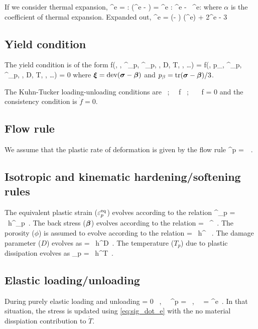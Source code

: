 If we consider thermal expansion,
\Beq
  \dot{\Bsig}^e =  : \left(\dot{\BVeps}^e - \alpha {}\BI\right)
                = \SfC^e : \dot{\BVeps}^e - \alpha {}\, \SfC^e:\BI
\Eeq
where $\alpha$ is the coefficient of thermal expansion.
Expanded out, 
\Beq \label{eq:sig_dot_e}
  \dot{\Bsig}^e = \left(\kappa - \mu\right) \Tr(\dot{\BVeps}^e) \BI + 2\mu\dot{\BVeps}^e 
                - 3\kappa\alpha{}\BI 
\Eeq

\subsection{Yield condition}
The yield condition is of the form
\Beq
  f(\Bsig, \Bbeta, \Veps^\Teq_p, \dot{\Veps}^\Teq_p, \phi, D, T, \Edot{\Teq}, \dots) =
  f(\Bxi, p_\beta, \Veps^\Teq_p, \dot{\Veps}^\Teq_p, \phi, D, T, \Edot{\Teq}, \dots) = 0
\Eeq
where $\boldsymbol{\xi} = \text{dev}(\boldsymbol{\sigma} - \boldsymbol{\beta})$ and $p_\beta = \text{tr}(\boldsymbol{\sigma} - \boldsymbol{\beta})/3$. 

The Kuhn-Tucker loading-unloading conditions are
\Beq
  \dot{\lambda}  ~;~~  f  ~;~~ \dot{\lambda}~f = 0
\Eeq
and the consistency condition is $\dot{f} = 0$.

\subsection{Flow rule}
We assume that the plastic rate of deformation is given by the flow rule
\Beq
  \dot{\BVeps}^p = \dot{\lambda}~\BM \,.
\Eeq

\subsection{Isotropic and kinematic hardening/softening rules}
The equivalent plastic strain ($\varepsilon_p^{\text{eq}}$) evolves according to the relation
\Beq
  \dot{\Veps}^\Teq_p = \dot{\lambda}~h^{\Veps_p} \,.
\Eeq
The back stress ($\boldsymbol{\beta}$) evolves according to the relation
\Beq
  \dot{\Bbeta} = \dot{\lambda}~\Bh^{\beta} \,.
\Eeq
The porosity ($\phi$) is assumed to evolve according to the relation
\Beq
  \dot{\phi} = \dot{\lambda}~h^{\phi} ~.
\Eeq
The damage parameter ($D$) evolves as
\Beq
   = \dot{\lambda}~h^D \,.
\Eeq
The temperature ($T_p$) due to plastic dissipation evolves as
\Beq
  _p = \dot{\lambda}~h^T \,.
\Eeq

\subsection{Elastic loading/unloading}
During purely elastic loading and unloading
\Beq
  \dot{\lambda} = 0 ~,~~ \dot{\BVeps}^p = \Bzero ~,~~ \dot{\BVeps} = \dot{\BVeps}^e \,.
\Eeq
In that situation, the stress is updated using \eqref{eq:sig_dot_e} with the no material
disspiation contribution to $\dot{T}$.

